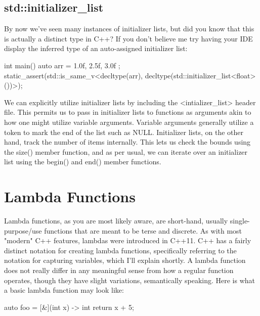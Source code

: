 \documentclass{article}
\begin{document}
\subsection{std::initializer\_list}

By now we've seen many instances of initializer lists, but did you know that this is actually a distinct type
in C++? If you don't believe me try having your IDE display the inferred type of an auto-assigned initializer
list:

\begin{cpplst}

int main()
{
    auto arr = { 1.0f, 2.5f, 3.0f };
    static_assert(std::is_same_v<decltype(arr), decltype(std::initializer_list<float>())>);
}

\end{cpplst}

We can explicitly utilize initializer lists by including the <intializer\_list> header file. This permits us
to pass in initializer lists to functions as arguments akin to how one might utilize variable arguments.
Variable arguments generally utilize a token to mark the end of the list such as NULL. Initializer lists, on
the other hand, track the number of items internally. This lets us check the bounds using the size() member
function, and as per usual, we can iterate over an initializer list using the begin() and end() member
functions.

\section{Lambda Functions}

Lambda functions, as you are most likely aware, are short-hand, usually single-purpose/use functions that
are meant to be terse and discrete. As with most "modern" C++ features, lambdas were introduced in C++11.
C++ has a fairly distinct notation for creating lambda functions, specifically referring to the notation for
capturing variables, which I'll explain shortly. A lambda function does not really differ in any meaningful
sense from how a regular function operates, though they have slight variations, semantically speaking. Here
is what a basic lambda function may look like:

\begin{cpplst}

auto foo = [&](int x) -> int
{
    return x + 5;
}

\end{cpplst}
\end{document}

